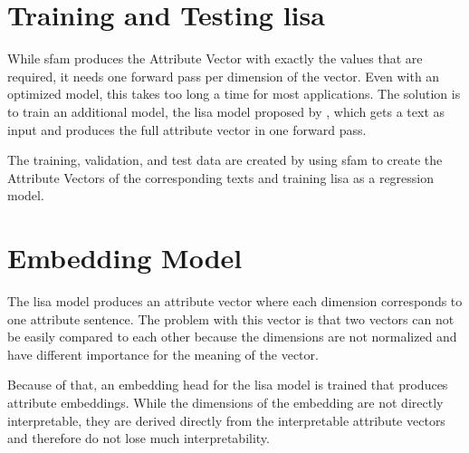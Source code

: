 \section{Training and Testing \acs{lisa}}%
\label{sec:approach:lisa}
While \ac{sfam} produces the Attribute Vector with exactly the values that are required, it needs one forward pass per dimension of the vector. Even with an optimized model, this takes too long a time for most applications. The solution is to train an additional model, the \acf{lisa} model proposed by \citet{patelLearningInterpretableStyle2023}, which gets a text as input and produces the full attribute vector in one forward pass.

The training, validation, and test data are created by using \ac{sfam} to create the Attribute Vectors of the corresponding texts and training \ac{lisa} as a regression model.


\section{Embedding Model}%
\label{sec:approach:embedding}
The \ac{lisa} model produces an attribute vector where each dimension corresponds to one attribute sentence. The problem with this vector is that two vectors can not be easily compared to each other because the dimensions are not normalized and have different importance for the meaning of the vector.

Because of that, an embedding head for the \ac{lisa} model is trained that produces attribute embeddings. While the dimensions of the embedding are not directly interpretable, they are derived directly from the interpretable attribute vectors and therefore do not lose much interpretability.

